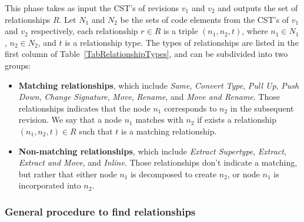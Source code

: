 This phase takes as input the CST's of revisions $v_1$ and $v_2$ and outputs the set of relationships $R$. Let $N_1$ and $N_2$ be the sets of code elements from the CST's of $v_1$ and $v_2$ respectively, each relationship $r \in R$ is a triple $(n_1, n_2, t)$, where $n_1 \in N_1$, $n_2 \in N_2$, and $t$ is a relationship type. The types of relationships are listed in the first column of Table~\ref{TabRelationshipTypes}, and can be subdivided into two groups:
\begin{itemize}
\item \textbf{Matching relationships}, which include \textit{Same}, \textit{Convert Type}, \textit{Pull Up}, \textit{Push Down}, \textit{Change Signature}, \textit{Move}, \textit{Rename}, and \textit{Move and Rename}.
Those relationships indicates that the node $n_1$ corresponds to $n_2$ in the subsequent revision.
We say that a node $n_1$ matches with $n_2$ if exists a relationship $(n_1, n_2, t) \in R$ such that $t$ is a matching relationship.

\item \textbf{Non-matching relationships}, which include \textit{Extract Supertype}, \textit{Extract}, \textit{Extract and Move}, and \textit{Inline}.
Those relationships don't indicate a matching, but rather that either node $n_1$ is decomposed to create $n_2$, or node $n_1$ is incorporated into $n_2$.
\end{itemize}


\subsubsection{General procedure to find relationships}

